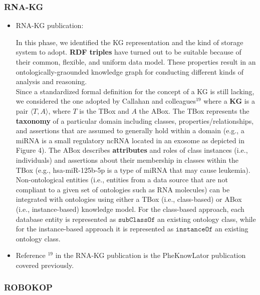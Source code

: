 \documentclass{article}
\begin{document}
\subsubsection{RNA-KG}

\begin{itemize}

\item RNA-KG publication:
\begin{displayquote}
In this phase, we identified the KG representation and the kind of storage system to adopt. \textbf{RDF triples} have turned out to be suitable because of their common, flexible, and uniform data model. These properties result in an ontologically-graounded knowledge graph for conducting different kinds of analysis and reasoning.\\
Since a standardized formal definition for the concept of a KG is still lacking, we considered the one adopted by Callahan and colleagues$^{19}$ where a \textbf{KG} is a pair $ \langle T, A \rangle $, where $ T $ is the TBox and $ A $ the ABox. The TBox represents the \textbf{taxonomy} of a particular domain including classes, properties/relationships, and assertions that are assumed to generally hold within a domain (e.g., a miRNA is a small regulatory ncRNA located in an exosome as depicted in Figure 4). The ABox describes \textbf{attributes} and roles of class instances (i.e., individuals) and assertions about their membership in classes within the TBox (e.g., hsa-miR-125b-5p is a type of miRNA that may cause leukemia). Non-ontological entities (i.e., entities from a data source that are not compliant to a given set of ontologies such as RNA molecules) can be integrated with ontologies using either a TBox (i.e., class-based) or ABox (i.e., instance-based) knowledge model. For the class-based approach, each database entity is represented as $ \texttt{subClassOf} $ an existing ontology class, while for the instance-based approach it is represented as $ \texttt{instanceOf} $ an existing ontology class.
\end{displayquote}

\item Reference $^{19}$ in the RNA-KG publication is the PheKnowLator publication covered previously.

\end{itemize}


\subsubsection{ROBOKOP}
\end{document}
